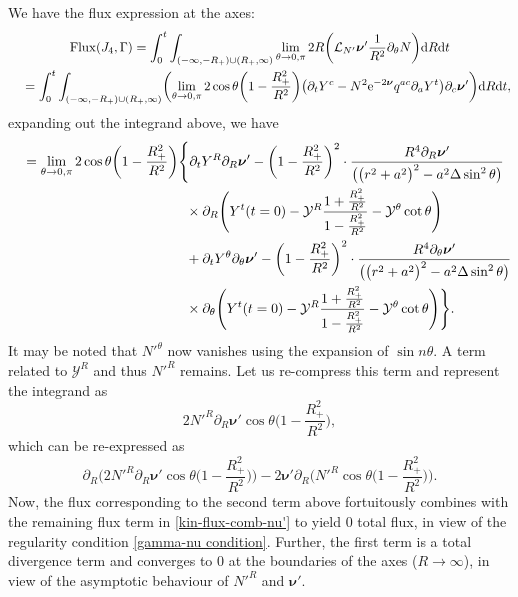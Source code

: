 \documentclass[11pt]{article}
\numberwithin{equation}{section}
\def\ptl{\partial}%
\def\mbo#1{\boldsymbol{#1}}%
\numberwithin{equation}{section}
\begin{document}
We have the flux expression at the axes:
\begin{gather*}
{\rm Flux} (J_4, \Gamma) = \int^t_0 \int_{ (-\infty,-R_
	+) \cup (R_+, \infty)} \lim_{\theta \to 0, \pi} 2 R \biggl(\mathcal{L}_{N'} \mbo{\nu}' \frac{1}{R^2} \ptl_\theta N \biggr) {\rm d}R {\rm d}t
\notag\\
\quad{}= \int^t_0 \int_{ (-\infty,-R_
	+) \cup (R_+, \infty)}\biggl(\lim_{\theta \to 0, \pi} 2 \cos \theta \biggl(1 - \frac{R^2_+}{R^2} \biggr) \bigl(\ptl_t Y^c - N^2 {\rm e}^{-2 \mbo{\nu}} q^{ac} \ptl_a Y^t \bigr) \ptl_c \mbo{\nu}' \biggr) {\rm d}R {\rm d}t,
\end{gather*}
expanding out the integrand above, we have
\begin{align*}
\quad&{} = \lim_{\theta \to 0, \pi} 2 \cos \theta \biggl(1 - \frac{R^2_+}{R^2} \biggr)
\Biggl\{ \ptl_t Y^R \ptl_R \mbo{\nu}' - \biggl (1- \frac{R^2_+}{R^2} \biggr)^2 \cdot \frac{R^4 \ptl_R \mbo{\nu}'}{ \bigl(\bigl(r^2+a^2\bigr)^2 -a^2 \Delta
	\sin^2 \theta \bigr)} \notag\\
&\hphantom{ = \lim_{\theta \to 0, \pi} 2 \cos \theta \biggl(1 - \frac{R^2_+}{R^2} \biggr)\Biggl\{}{}
\times \ptl_R \Biggl(Y^t (t=0) - \mathcal{Y}^R \frac{1 + \frac{R^2_+}{R^2}} {{1-\frac{R^2_+}{R^2}} } - \mathcal{Y}^ \theta \cot \theta \Biggr) \notag\\
&\hphantom{ = \lim_{\theta \to 0, \pi} 2 \cos \theta \biggl(1 - \frac{R^2_+}{R^2} \biggr)\Biggl\{}{}
+ \ptl_t Y^\theta \ptl_\theta \mbo{\nu}' - \biggl(1 - \frac{R^2_+}{R^2} \biggr)^2 \cdot \frac{R^4 \ptl_\theta \mbo{\nu}'}{ \bigl(\bigl(r^2+a^2\bigr)^2 -a^2 \Delta \sin^2 \theta\bigr)} \notag\\
&\hphantom{ = \lim_{\theta \to 0, \pi} 2 \cos \theta \biggl(1 - \frac{R^2_+}{R^2} \biggr)\Biggl\{}{}
\times \ptl_\theta \Biggl(Y^t(t=0) - \mathcal{Y}^R \frac{1+ \frac{R^2_+}{R^2}}{1-\frac{R^2_+}{R^2}} - \mathcal{Y}^\theta \cot \theta \Biggr) \Biggr\}.
\end{align*}
It may be noted that $N'^\theta$ now vanishes using the expansion of $\sin n \theta $.
A term related to $\mathcal{Y}^R$ and thus $N'^R$ remains. Let us re-compress this term and represent the integrand as
\[
2N'^R \ptl_R \mbo{\nu}' \cos \theta\biggl(1- \frac{R^2_+}{R^2}\biggr),
\]
which can be re-expressed as
\[
\ptl_R \biggl(2 N'^R \ptl_R \mbo{\nu}' \cos \theta \biggl(1- \frac{R^2_+}{R^2} \biggr) \biggr) - 2 \mbo{\nu'}\ptl_R \biggl(N'^R \cos \theta \biggl(1-\frac{R^2_+}{R^2} \biggr) \biggr).
\]
Now, the flux corresponding to the second term above fortuitously combines with the remaining flux term in \eqref{kin-flux-comb-nu'} to yield $0$ total flux, in view of the regularity condition \eqref{gamma-nu condition}. Further, the first term is a total divergence term and converges to $0$ at the boundaries of the axes ($R \to \infty$), in view of the asymptotic behaviour of $N'^R$ and $\mbo{\nu'}$.
\end{document}
